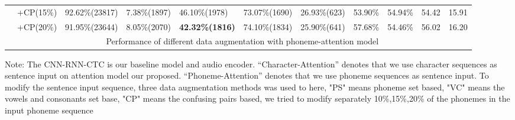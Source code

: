 \documentclass[a4paper]{article}
\begin{document}
\begin{table}[]
{\begin{tabular}{l|r|l|l|l|l|l|l|c|c|l|}
 & +CP(15\%)                                    & 92.62\%(23817)                                                                              & 7.38\%(1897)                                                                                   & 46.10\%(1978)                                                                                 & 73.07\%(1690)                                                                  & 26.93\%(623)                                                                & 53.90\%                       & 54.94\%                          & 54.42               & 15.91               \\ \cline{2-11} 
 
 & +CP(20\%)                                    & 91.95\%(23644)                                                                              & 8.05\%(2070)                                                                                   & \textbf{42.32\%(1816)}                                                                                 & 74.10\%(1834)                                                                  & 25.90\%(641)                                                                & 57.68\%                       & 54.46\%                          & 56.02               & 16.20               \\ \cline{2-11} 
 & \multicolumn{10}{c|}{Performance of different data augmentation with phoneme-attention model}                                                                                                                                                                                                                                                                                                                                                                                                                                                                                                                           \\ \cline{2-11} 
\end{tabular}%
}

\footnotesize
Note: The CNN-RNN-CTC is our baseline model and audio encoder. “Character-Attention” denotes that we use character sequences as sentence input on attention model our proposed. “Phoneme-Attention” denotes that we use phoneme sequences as sentence input. To modify the sentence input sequence, three data augmentation methods was used to here, "PS" means phoneme set based, "VC" means the vowels and consonants set base, "CP" means the confusing pairs based, we tried to modify separately 10\%,15\%,20\% of the phonemes in the input phoneme sequence

\end{table}
\end{document}

